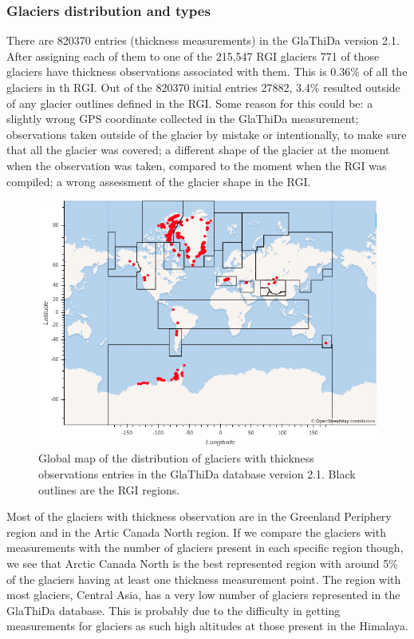 \subsubsection{Glaciers distribution and types}
There are 820370 entries (thickness measurements) in the GlaThiDa version 2.1. After assigning each of them to one of the 215,547 RGI glaciers 771 of those glaciers have thickness observations associated with them. This is 0.36\% of all the glaciers in th RGI. Out of the 820370 initial entries 27882, 3.4\% resulted outside of any glacier outlines defined in the RGI. Some reason for this could be: a slightly wrong GPS coordinate collected in the GlaThiDa measurement; observations taken outside of the glacier by mistake or intentionally, to make sure that all the glacier was covered; a different shape of the glacier at the moment when the observation was taken, compared to the moment when the RGI was compiled; a wrong assessment of the glacier shape in the RGI.
\begin{figure}\label{glathidamap} 
	\centering 
	\includegraphics[width=1.0\textwidth]{./figures/GlaThiDa_map.png}
	\caption{Global map of the distribution of glaciers with thickness observations entries in the GlaThiDa database version 2.1. Black outlines are the RGI regions.}
\end{figure}

Most of the glaciers with thickness observation are in the Greenland Periphery region and in the Artic Canada North region. If we compare the glaciers with measurements with the number of glaciers present in each specific region though, we see that Arctic Canada North is the best represented region with around 5\% of the glaciers having at least one thickness measurement point. The region with most glaciers, Central Asia, has a very low number of glaciers represented in the GlaThiDa database. This is probably due to the difficulty in getting measurements for glaciers as such high altitudes at those present in the Himalaya.


